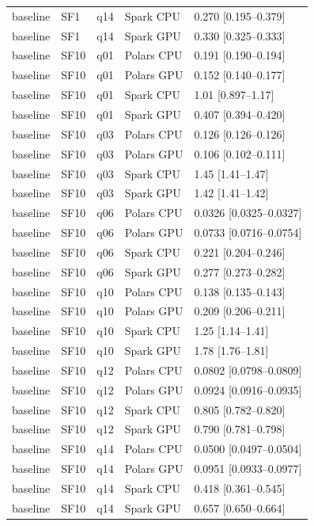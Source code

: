 \begin{longtable}{lllll}
baseline & SF1 & q14 & Spark CPU & 0.270 [0.195--0.379] \\
baseline & SF1 & q14 & Spark GPU & 0.330 [0.325--0.333] \\
baseline & SF10 & q01 & Polars CPU & 0.191 [0.190--0.194] \\
baseline & SF10 & q01 & Polars GPU & 0.152 [0.140--0.177] \\
baseline & SF10 & q01 & Spark CPU & 1.01 [0.897--1.17] \\
baseline & SF10 & q01 & Spark GPU & 0.407 [0.394--0.420] \\
baseline & SF10 & q03 & Polars CPU & 0.126 [0.126--0.126] \\
baseline & SF10 & q03 & Polars GPU & 0.106 [0.102--0.111] \\
baseline & SF10 & q03 & Spark CPU & 1.45 [1.41--1.47] \\
baseline & SF10 & q03 & Spark GPU & 1.42 [1.41--1.42] \\
baseline & SF10 & q06 & Polars CPU & 0.0326 [0.0325--0.0327] \\
baseline & SF10 & q06 & Polars GPU & 0.0733 [0.0716--0.0754] \\
baseline & SF10 & q06 & Spark CPU & 0.221 [0.204--0.246] \\
baseline & SF10 & q06 & Spark GPU & 0.277 [0.273--0.282] \\
baseline & SF10 & q10 & Polars CPU & 0.138 [0.135--0.143] \\
baseline & SF10 & q10 & Polars GPU & 0.209 [0.206--0.211] \\
baseline & SF10 & q10 & Spark CPU & 1.25 [1.14--1.41] \\
baseline & SF10 & q10 & Spark GPU & 1.78 [1.76--1.81] \\
baseline & SF10 & q12 & Polars CPU & 0.0802 [0.0798--0.0809] \\
baseline & SF10 & q12 & Polars GPU & 0.0924 [0.0916--0.0935] \\
baseline & SF10 & q12 & Spark CPU & 0.805 [0.782--0.820] \\
baseline & SF10 & q12 & Spark GPU & 0.790 [0.781--0.798] \\
baseline & SF10 & q14 & Polars CPU & 0.0500 [0.0497--0.0504] \\
baseline & SF10 & q14 & Polars GPU & 0.0951 [0.0933--0.0977] \\
baseline & SF10 & q14 & Spark CPU & 0.418 [0.361--0.545] \\
baseline & SF10 & q14 & Spark GPU & 0.657 [0.650--0.664] \\

\end{longtable}
